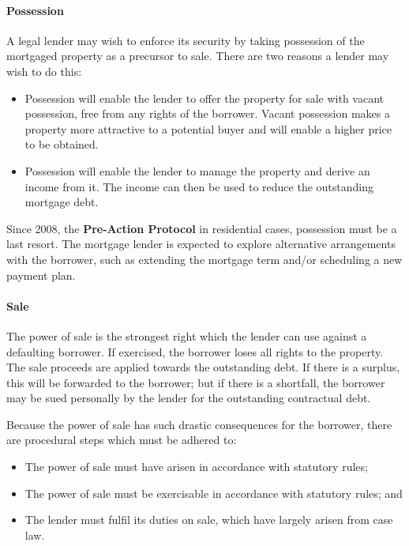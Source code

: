 \documentclass[
]{article}
\providecommand{\tightlist}{%
  \setlength{\itemsep}{0pt}\setlength{\parskip}{0pt}}
\begin{document}
\hypertarget{possession}{%
\paragraph{Possession}\label{possession}}

A legal lender may wish to enforce its security by taking possession of
the mortgaged property as a precursor to sale. There are two reasons a
lender may wish to do this:

\begin{itemize}
\tightlist
\item
  Possession will enable the lender to offer the property for sale with
  vacant possession, free from any rights of the borrower. Vacant
  possession makes a property more attractive to a potential buyer and
  will enable a higher price to be obtained.
\item
  Possession will enable the lender to manage the property and derive an
  income from it. The income can then be used to reduce the outstanding
  mortgage debt.
\end{itemize}

Since 2008, the \textbf{Pre-Action Protocol} in residential cases,
possession must be a last resort. The mortgage lender is expected to
explore alternative arrangements with the borrower, such as extending
the mortgage term and/or scheduling a new payment plan.

\hypertarget{sale}{%
\paragraph{Sale}\label{sale}}

The power of sale is the strongest right which the lender can use
against a defaulting borrower. If exercised, the borrower loses all
rights to the property. The sale proceeds are applied towards the
outstanding debt. If there is a surplus, this will be forwarded to the
borrower; but if there is a shortfall, the borrower may be sued
personally by the lender for the outstanding contractual debt.

Because the power of sale has such drastic consequences for the
borrower, there are procedural steps which must be adhered to:

\begin{itemize}
\tightlist
\item
  The power of sale must have arisen in accordance with statutory rules;
\item
  The power of sale must be exercisable in accordance with statutory
  rules; and
\item
  The lender must fulfil its duties on sale, which have largely arisen
  from case law.
\end{itemize}
\end{document}
